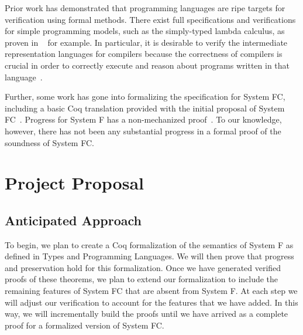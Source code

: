 \documentclass{sig-alternate}
\begin{document}
Prior work has demonstrated that programming languages are ripe targets for verification using 
formal methods. There exist full specifications and verifications for simple programming
models, such as the simply-typed lambda calculus, as proven in ~\cite{Pierce:SF} for example. In particular, it is desirable to verify the intermediate representation languages for compilers because the correctness of compilers is crucial in order to correctly execute and reason about programs written in that language~\cite{Zhao:2012:FLI:2103656.2103709}.

Further, some work has gone into formalizing the specification for System FC, including a basic 
Coq translation provided with the initial proposal of System FC~\cite{conf/tldi/SulzmannCJD07}. 
Progress for System F has a non-mechanized proof~\cite{Girard:1989:PT:64805}. To our knowledge, however, there has not been any substantial progress in a formal 
proof of the soundness of System FC.

\section{Project Proposal}
\label{sec:project_proposal}

\subsection{Anticipated Approach}
\label{subsec:approach}
To begin, we plan to create a Coq formalization of the semantics of System F as defined in Types and Programming Languages. We will then prove that progress and preservation hold for this formalization. Once we have generated verified proofs of these theorems, we plan to extend our formalization to include the remaining features of System FC that are absent from System F.  At each step we will adjust our verification to account for the features that we have added.  In this way, we will incrementally build the proofs until we have arrived as a complete proof for a formalized version of System FC.
\end{document}
